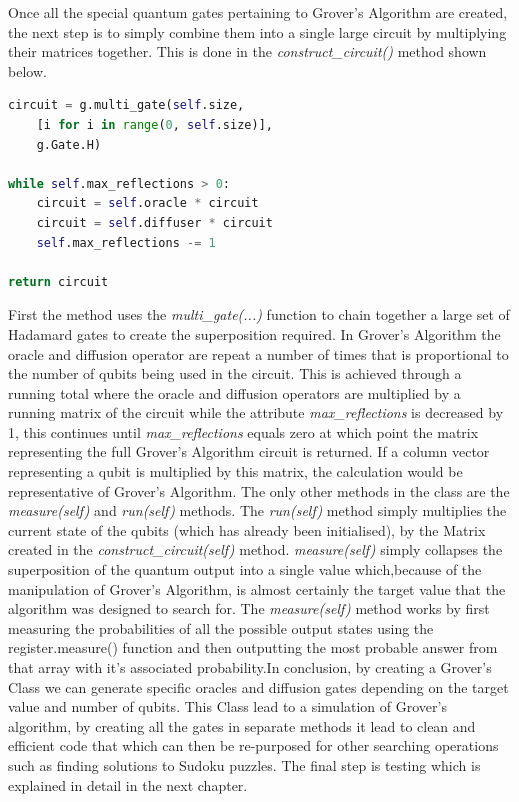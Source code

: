 \documentclass{article}
\begin{document}
Once all the special quantum gates pertaining to Grover's Algorithm are created, the next step is to simply combine them into a single large circuit by multiplying their matrices together. This is done in the \textit{construct\_circuit()} method shown below.

\begin{file}
\begin{lstlisting}[language=Python]
circuit = g.multi_gate(self.size, 
	[i for i in range(0, self.size)],
	g.Gate.H)

while self.max_reflections > 0:
	circuit = self.oracle * circuit
	circuit = self.diffuser * circuit
	self.max_reflections -= 1
	
return circuit

\end{lstlisting}
\end{file}

First the method uses the \textit{multi\_gate(...)} function to chain together a large set of Hadamard gates to create the superposition required. In Grover's Algorithm the oracle and diffusion operator are repeat a number of times that is proportional to the number of qubits being used in the circuit. This is achieved through a running total where the oracle and diffusion operators are multiplied by a running matrix of the circuit while the attribute \textit{max\_reflections} is decreased by 1, this continues until  \textit{max\_reflections} equals zero at which point the matrix representing the full Grover's Algorithm circuit is returned. If a column vector representing a qubit is multiplied by this matrix, the calculation would be representative of Grover's Algorithm. The only other methods in the class are the \textit{measure(self)} and \textit{run(self)} methods. The \textit{run(self)} method simply multiplies the current state of the qubits (which has already been initialised), by the Matrix created in the \textit{construct\_circuit(self)} method. \textit{measure(self)} simply collapses the superposition of the quantum output into a single value which,because of the manipulation of Grover's Algorithm, is almost certainly the target value that the algorithm was designed to search for. The \textit{measure(self)} method works by first measuring the probabilities of all the possible output states using the register.measure() function and then outputting the most probable answer from that array with it's associated probability.In conclusion, by creating a Grover's Class we can generate specific oracles and diffusion gates depending on the target value and number of qubits. This Class lead to a simulation of Grover's algorithm, by creating all the gates in separate methods it lead to clean and efficient code that which can then be re-purposed for other searching operations such as finding solutions to Sudoku puzzles. The final step is testing which is explained in detail in the next chapter.
\end{document}
